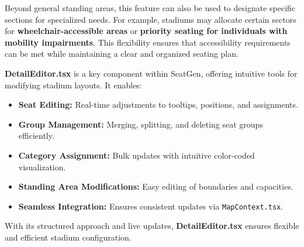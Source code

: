 Beyond general standing areas, this feature can also be used to designate specific sections for specialized needs. For example, stadiums may allocate certain sectors for \textbf{wheelchair-accessible areas} or \textbf{priority seating for individuals with mobility impairments}. This flexibility ensures that accessibility requirements can be met while maintaining a clear and organized seating plan.

\textbf{DetailEditor.tsx} is a key component within SeatGen, offering intuitive tools for modifying stadium layouts. It enables:
\begin{itemize}
    \item \textbf{Seat Editing:} Real-time adjustments to tooltips, positions, and assignments.
    \item \textbf{Group Management:} Merging, splitting, and deleting seat groups efficiently.
    \item \textbf{Category Assignment:} Bulk updates with intuitive color-coded visualization.
    \item \textbf{Standing Area Modifications:} Easy editing of boundaries and capacities.
    \item \textbf{Seamless Integration:} Ensures consistent updates via \texttt{MapContext.tsx}.
\end{itemize}

With its structured approach and live updates, \textbf{DetailEditor.tsx} ensures flexible and efficient stadium configuration.
